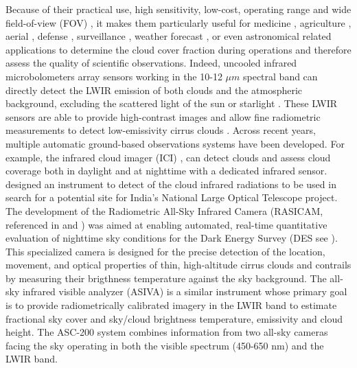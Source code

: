 \documentclass[amt, article]{copernicus}
\begin{document}
Because of their practical use, high sensitivity, low-cost, operating range and wide field-of-view (FOV) \citep{Rogalski2011,Rogalski2014,Kimata2018}, it makes them particularly useful for medicine \citep{ring2012infrared}, agriculture \citep{ishimwe2014applications}, aerial \citep{wilczak1996ground}, defense \citep{gallo1993low, akula2011thermal}, surveillance \citep{wong2009effective}, weather forecast \citep{sun2008whole, Liandrat2017}, or even astronomical related applications \citep{Klebe2010, lewis2010radiometric,Klebe2012,Klebe2014, reil2014update} to determine the cloud cover fraction during operations and therefore assess the quality of scientific observations. Indeed, uncooled infrared microbolometers array sensors working in the 10-12 $\mu m$ spectral band can directly detect the LWIR emission of both clouds and the atmospheric background, excluding the scattered light of the sun or starlight \citep{Houghton1972}. These LWIR sensors are able to provide high-contrast images and allow fine radiometric measurements to detect low-emissivity cirrus clouds \citep{lewis2010radiometric,Shaw_2013}.
Across recent years, multiple automatic ground-based observations systems have been developed. For example, the infrared cloud imager (ICI) \citep{ICI}, can detect clouds and assess cloud coverage both in daylight and at nighttime with a dedicated infrared sensor. \citet{Sharma2015} designed an instrument to detect of the cloud infrared radiations to be used in search for a potential site for India’s National Large Optical Telescope project. The development of the Radiometric All-Sky Infrared Camera (RASICAM, referenced in \citealt{lewis2010radiometric} and \citealt{reil2014update}) was aimed at enabling automated, real-time quantitative evaluation of nighttime sky conditions for the Dark Energy Survey (DES see \citealt{DES}). This specialized camera is designed for the precise detection of the location, movement, and optical properties of thin, high-altitude cirrus clouds and contrails by measuring their brigthness temperature against the sky background. The all-sky infrared visible analyzer (ASIVA)\citep{Klebe2014} is a similar instrument whose primary goal is to provide radiometrically calibrated imagery in the LWIR band to estimate fractional sky cover and sky/cloud brightness temperature, emissivity and cloud height. The ASC-200 system \citep{rs13091852} combines information from two all-sky cameras facing the sky operating in both the visible spectrum (450-650 nm) and the LWIR band.
\end{document}
